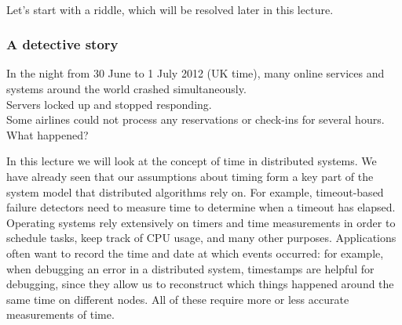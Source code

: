 \begin{frame}
    \begin{center}
        {\Large{\color{darkblue}{Time, clocks, and ordering of events}}} \\[2em]
        \mydetails
    \end{center}
\end{frame}

Let's start with a riddle, which will be resolved later in this lecture.

\begin{frame}
    \label{s:mystery}
    \frametitle{A detective story}
    In the night from 30 June to 1 July 2012 (UK time), many online services and systems around the world crashed simultaneously.\\[1em]
    Servers locked up and stopped responding.\\[1em]
    Some airlines could not process any reservations or check-ins for several hours.\\[1em]
    What happened?
\end{frame}
\label{l:mystery}

In this lecture we will look at the concept of time in distributed systems.
We have already seen that our assumptions about timing form a key part of the system model that distributed algorithms rely on.
For example, timeout-based failure detectors need to measure time to determine when a timeout has elapsed.
Operating systems rely extensively on timers and time measurements in order to schedule tasks, keep track of CPU usage, and many other purposes.
Applications often want to record the time and date at which events occurred: for example, when debugging an error in a distributed system, timestamps are helpful for debugging, since they allow us to reconstruct which things happened around the same time on different nodes.
All of these require more or less accurate measurements of time.

